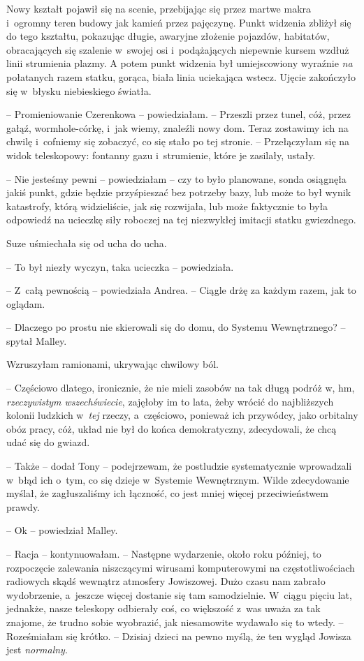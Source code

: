 \documentclass[oneside,polish,11pt,sfheadings]{mwbk}
\begin{document}
Nowy kształt pojawił się na scenie, przebijając się przez martwe makra i~ogromny teren budowy jak kamień przez pajęczynę. Punkt widzenia zbliżył
się do tego kształtu, pokazując długie, awaryjne złożenie pojazdów,
habitatów, obracających się szalenie w~swojej osi i~podążających
niepewnie kursem wzdłuż linii strumienia plazmy. A potem punkt widzenia
był umiejscowiony wyraźnie \textit{na} połatanych razem statku, gorąca,
biała linia uciekająca wstecz. Ujęcie zakończyło się w~błysku
niebieskiego światła.

-- Promieniowanie Czerenkowa -- powiedziałam. -- Przeszli przez tunel, cóż,
przez gałąź, wormhole-córkę, i~jak wiemy, znaleźli nowy dom. Teraz
zostawimy ich na chwilę i~cofniemy się zobaczyć, co się stało po tej
stronie. -- Przełączyłam się na widok teleskopowy: fontanny gazu i~strumienie, które je zasilały, ustały.

-- Nie jesteśmy pewni -- powiedziałam -- czy to było planowane, sonda
osiągnęła jakiś punkt, gdzie będzie przyśpieszać bez potrzeby bazy, lub
może to był wynik katastrofy, którą widzieliście, jak się rozwijała, lub
może faktycznie to była odpowiedź na ucieczkę siły roboczej na tej
niezwykłej imitacji statku gwiezdnego.

Suze uśmiechała się od ucha do ucha.

-- To był niezły wyczyn, taka ucieczka -- powiedziała.

-- Z~całą pewnością -- powiedziała Andrea. -- Ciągle drżę za każdym razem,
jak to oglądam.

-- Dlaczego po prostu nie skierowali się do domu, do Systemu
Wewnętrznego? -- spytał Malley.

Wzruszyłam ramionami, ukrywając chwilowy ból. 

-- Częściowo dlatego,
ironicznie, że nie mieli zasobów na tak długą podróż w, hm,
\textit{rzeczywistym wszechświecie}, zajęłoby im to lata, żeby wrócić do
najbliższych kolonii ludzkich w~\textit{tej} rzeczy, a~częściowo, ponieważ
ich przywódcy, jako orbitalny obóz pracy, cóż, układ nie był do końca
demokratyczny, zdecydowali, że chcą udać się do gwiazd.

-- Także -- dodał Tony -- podejrzewam, że postludzie systematycznie
wprowadzali w~błąd ich o~tym, co się dzieje w~Systemie Wewnętrznym.
Wilde zdecydowanie myślał, że zagłuszaliśmy ich łączność, co jest mniej
więcej przeciwieństwem prawdy.

-- Ok -- powiedział Malley.

-- Racja -- kontynuowałam. -- Następne wydarzenie, około roku później, to
rozpoczęcie zalewania niszczącymi wirusami komputerowymi na
częstotliwościach radiowych skądś wewnątrz atmosfery Jowiszowej. Dużo
czasu nam zabrało wydobrzenie, a~jeszcze więcej dostanie się tam
samodzielnie. W~ciągu pięciu lat, jednakże, nasze teleskopy odbierały
coś, co większość z~was uważa za tak znajome, że trudno sobie wyobrazić,
jak niesamowite wydawało się to wtedy. -- Roześmiałam się krótko. -- Dzisiaj dzieci na pewno myślą, że ten wygląd Jowisza jest
\textit{normalny}.
\end{document}

